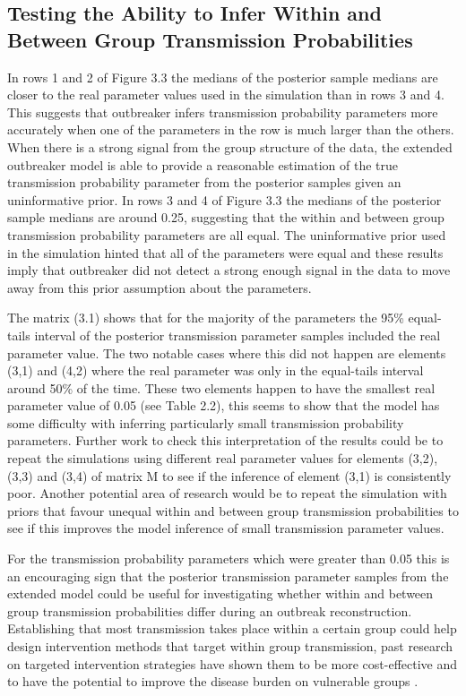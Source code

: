\documentclass[11pt,a4paper]{report}
\begin{document}
\subsection{Testing the Ability to Infer Within and Between Group Transmission Probabilities}
In rows 1 and 2 of Figure 3.3 the medians of the posterior sample medians are closer to the real parameter values used in the simulation than in rows 3 and 4. This suggests that outbreaker infers transmission probability parameters more accurately when one of the parameters in the row is much larger than the others. When there is a strong signal from the group structure of the data, the extended outbreaker model is able to provide a reasonable estimation of the true transmission probability parameter from the posterior samples given an uninformative prior. In rows 3 and 4 of Figure 3.3 the medians of the posterior sample medians are around 0.25, suggesting that the within and between group transmission probability parameters are all equal. The uninformative prior used in the simulation hinted that all of the parameters were equal and these results imply that outbreaker did not detect a strong enough signal in the data to move away from this prior assumption about the parameters. 

The matrix (3.1) shows that for the majority of the parameters the 95\% equal-tails interval of the posterior transmission parameter samples included the real parameter value. The two notable cases where this did not happen are elements (3,1) and (4,2) where the real parameter was only in the equal-tails interval around 50\% of the time. These two elements happen to have the smallest real parameter value of 0.05 (see Table 2.2), this seems to show that the model has some difficulty with inferring particularly small transmission probability parameters. Further work to check this interpretation of the results could be to repeat the simulations using different real parameter values for elements (3,2), (3,3) and (3,4) of matrix M to see if the inference of element (3,1) is consistently poor. Another potential area of research would be to repeat the simulation with priors that favour unequal within and between group transmission probabilities to see if this improves the model inference of small transmission parameter values.

For the transmission probability parameters which were greater than 0.05 this is an encouraging sign that the posterior transmission parameter samples from the extended model could be useful for investigating whether within and between group transmission probabilities differ during an outbreak reconstruction. Establishing that most transmission takes place within a certain group could help design intervention methods that target within group transmission, past research on targeted intervention strategies have shown them to be more cost-effective \citep{Lugner13} and to have the potential to improve the disease burden on vulnerable groups \citep{Dushoff07}.  
\end{document}
